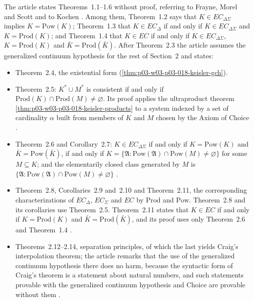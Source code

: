 The article states Theorems~1.1--1.6 without proof, referring to Frayne,
Morel and Scott and to Kochen \cite[p.~483]{Keisler1961ElementaryClasses}.
Among them, Theorem~1.2 says that \(K\in EC_{\Delta\Sigma}\) implies
\(K=\mathrm{Pow}(K)\); Theorem~1.3 that \(K\in EC_\Delta\) if and only if
\(K\in EC_{\Delta\Sigma}\) and \(K=\mathrm{Prod}(K)\); and Theorem~1.4 that
\(K\in EC\) if and only if \(K\in EC_{\Delta\Sigma}\),
\(K=\mathrm{Prod}(K)\) and \(\bar K=\mathrm{Prod}(\bar K)\).  After
Theorem~2.3 the article assumes the generalized continuum hypothesis for the
rest of Section~2 \cite[p.~487]{Keisler1961ElementaryClasses} and states:
\begin{itemize}
  \item Theorem~2.4, the existential form
        (\cref{thm:p03-w03-p03-018-keisler-gch}).
  \item Theorem~2.5: \(K^*\cup M^*\) is consistent if and only if
        \(\mathrm{Prod}(K)\cap\mathrm{Prod}(M)\neq\varnothing\).  Its proof
        applies the ultraproduct theorem
        \cref{thm:p03-w03-p03-018-keisler-products} to a system indexed by a
        set of cardinality \(\alpha\) built from members of \(K\) and \(M\)
        chosen by the Axiom of Choice
        \cite[pp.~487--488]{Keisler1961ElementaryClasses}.
  \item Theorem~2.6 and Corollary~2.7: \(K\in EC_{\Delta\Sigma}\) if and
        only if \(K=\mathrm{Pow}(K)\) and \(\bar K=\mathrm{Pow}(\bar K)\),
        if and only if
        \(K=\{\mathfrak A:\mathrm{Pow}(\mathfrak A)\cap\mathrm{Pow}(M)\neq
        \varnothing\}\) for some \(M\subseteq K\); and the elementarily
        closed class generated by \(M\) is
        \(\{\mathfrak A:\mathrm{Pow}(\mathfrak A)\cap\mathrm{Pow}(M)\neq
        \varnothing\}\) \cite[p.~488]{Keisler1961ElementaryClasses}.
  \item Theorem~2.8, Corollaries~2.9 and~2.10 and Theorem~2.11, the
        corresponding characterizations of \(EC_\Delta\), \(EC_\Sigma\) and
        \(EC\) by \(\mathrm{Prod}\) and \(\mathrm{Pow}\).  Theorem~2.8 and
        its corollaries use Theorem~2.5.  Theorem~2.11 states that
        \(K\in EC\) if and only if \(K=\mathrm{Prod}(K)\) and
        \(\bar K=\mathrm{Prod}(\bar K)\), and its proof uses only
        Theorem~2.6 and Theorem~1.4 \cite[p.~488]{Keisler1961ElementaryClasses}.
  \item Theorems~2.12--2.14, separation principles, of which the last
        yields Craig's interpolation theorem; the article remarks that the use
        of the generalized continuum hypothesis there does no harm, because
        the syntactic form of Craig's theorem is a statement about natural
        numbers, and such statements provable with the generalized continuum
        hypothesis and Choice are provable without them
        \cite[pp.~488--490]{Keisler1961ElementaryClasses}.
\end{itemize}
